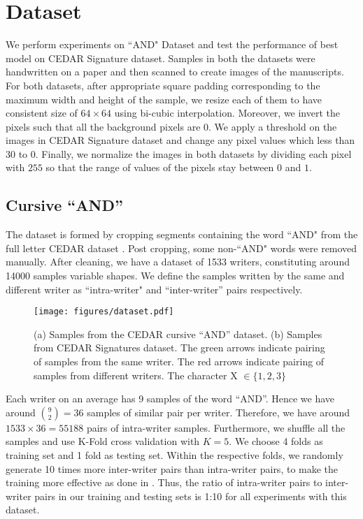 \documentclass[a4paper,conference]{IEEEtran}
\begin{document}
\section{Dataset}
We perform experiments on ``AND" Dataset \cite{srihari_individuality_2001, chauhan_explanation_2019} and test the performance of best model on CEDAR Signature \cite{signature_verif_dataset} dataset. Samples in both the datasets were handwritten on a paper and then scanned to create images of the manuscripts. For both datasets, after appropriate square padding corresponding to the maximum width and height of the sample, we resize each of them to have consistent size of $64 \times 64$  using bi-cubic interpolation. Moreover, we invert the pixels such that all the background pixels are 0. We apply a threshold on the images in CEDAR Signature dataset and change any pixel values which less than 30 to 0. Finally, we normalize the images in both datasets by dividing each pixel with $255$ so that the range of values of the pixels stay between $0$ and $1$.
\subsection{Cursive ``AND''}
The dataset is formed by cropping segments containing the word ``AND" from the full letter CEDAR dataset \cite{srihari_individuality_2001}. Post cropping, some non-``AND" words were removed manually. After cleaning, we have a dataset of 1533 writers, constituting around 14000 samples variable shapes.
\newline \indent We define the samples written by the same and different writer as ``intra-writer" and ``inter-writer'' pairs respectively.
\begin{figure}[!h]
\begin{center}
\texttt{[image: figures/dataset.pdf]}
\caption{\label{fig:dataset} (a) Samples from the CEDAR cursive ``AND'' dataset. (b) Samples from CEDAR Signatures dataset. The green arrows indicate pairing of samples from the same writer. The red arrows indicate pairing of samples from different writers. The character X $ \in \{1,2,3\} $} 
\end{center}
\end{figure}
\newline \indent Each writer on an average has 9 samples of the word ``AND''. Hence we have around $ {{9 \choose 2} = 36}$ samples of similar pair per writer. Therefore, we have around ${1533 \times 36 = 55188}$ pairs of intra-writer samples. Furthermore, we shuffle all the samples and use K-Fold cross validation \cite{k_fold_95} with ${K=5}$. We choose 4 folds as training set and 1 fold as testing set. Within the respective folds, we randomly generate 10 times more inter-writer pairs than intra-writer pairs, to make the training more effective as done in  \cite{kurczab_influence_2014}. Thus, the ratio of intra-writer pairs to inter-writer pairs in our training and testing sets is 1:10 for all experiments with this dataset.
\end{document}

